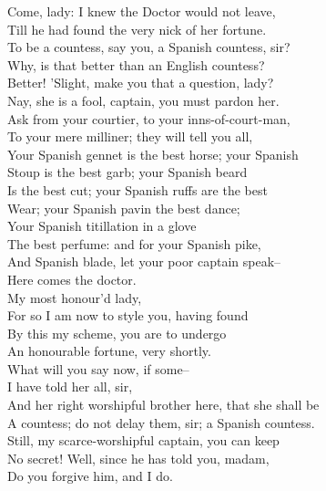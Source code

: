 \documentclass{memoir}
\begin{document}
\begin{drama*}
\facespeaks  Come, lady: I knew the Doctor would not leave,\\
 Till he had found the very nick of her fortune.\\
\kastrilspeaks  To be a countess, say you, a Spanish countess, sir?\\
\pliantspeaks  Why, is that better than an English countess?\\
\facespeaks  Better! 'Slight, make you that a question, lady?\\
\kastrilspeaks  Nay, she is a fool, captain, you must pardon her.\\
\facespeaks  Ask from your courtier, to your inns-of-court-man,\\
 To your mere milliner; they will tell you all,\\
 Your Spanish gennet is the best horse; your Spanish\\
 Stoup is the best garb; your Spanish beard\\
 Is the best cut; your Spanish ruffs are the best\\
 Wear; your Spanish pavin the best dance;\\
 Your Spanish titillation in a glove\\
 The best perfume: and for your Spanish pike,\\
 And Spanish blade, let your poor captain speak--\\
 Here comes the doctor.\\
\subtlespeaks {} My most honour'd lady,\\
 For so I am now to style you, having found\\
 By this my scheme, you are to undergo\\
 An honourable fortune, very shortly.\\
 What will you say now, if some--\\
\facespeaks {} I have told her all, sir,\\
 And her right worshipful brother here, that she shall be\\
 A countess; do not delay them, sir; a Spanish countess.\\
\subtlespeaks  Still, my scarce-worshipful captain, you can keep\\
 No secret! Well, since he has told you, madam,\\
 Do you forgive him, and I do.\\

\end{drama*}
\end{document}
